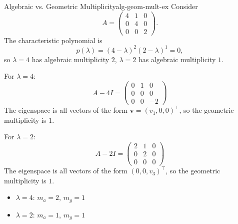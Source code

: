 \begin{example}{Algebraic vs. Geometric Multiplicity}{alg-geom-mult-ex}
    Consider
    \[
        A = \begin{pmatrix}
            4 & 1 & 0 \\
            0 & 4 & 0 \\
            0 & 0 & 2
        \end{pmatrix}.
    \]
    The characteristic polynomial is
    \[
        p(\lambda) = (4-\lambda)^2(2-\lambda)^1 = 0,
    \]
    so \(\lambda=4\) has algebraic multiplicity \(2\), \(\lambda=2\) has algebraic multiplicity \(1\).

    For \(\lambda=4\):
    \[
        A - 4I = \begin{pmatrix}
            0 & 1 & 0  \\
            0 & 0 & 0  \\
            0 & 0 & -2
        \end{pmatrix}
    \]
    The eigenspace is all vectors of the form \(\mathbf{v} = (v_1, 0, 0)^\top\), so the geometric multiplicity is \(1\).

    For \(\lambda=2\):
    \[
        A - 2I = \begin{pmatrix}
            2 & 1 & 0 \\
            0 & 2 & 0 \\
            0 & 0 & 0
        \end{pmatrix}
    \]
    The eigenspace is all vectors of the form \((0, 0, v_3)^\top\), so the geometric multiplicity is \(1\).
    \medskip
    \begin{itemize}[nosep]
        \item \(\lambda=4\): \(m_a=2\), \(m_g=1\)
        \item \(\lambda=2\): \(m_a=1\), \(m_g=1\)
    \end{itemize}

    \begin{figure}[H]
        \centering
\end{figure}
\end{example}
